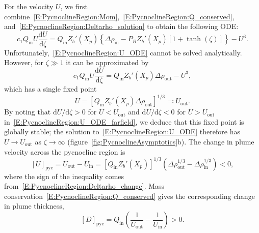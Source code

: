 \documentclass[openacc]{rsproca_new}%
\newcommand{\dd}[2]{\frac{\mathrm{d} #1}{\mathrm{d} #2}}
\newcommand{\Pb}{\textit{P}_B}  %
\newcommand{\cone}{c_1}  %
\renewcommand{\in}{\text{in}} %
\newcommand{\out}{\text{out}}
\begin{document}
For the velocity $U$, we first combine~\eqref{E:PycnoclineRegion:Mom},~\eqref{E:PycnoclineRegion:Q_conserved}, and~\eqref{E:PycnoclineRegion:Deltarho_solution} to obtain the following ODE: 
\begin{equation}\label{E:PycnoclineRegion:U_ODE}
\cone Q_\in U \dd{U}{\zeta} = Q_\in Z_b'(X_p)\left\{\Delta \rho_\in - \Pb Z_b'(X_p) \left[1 + \tanh(\zeta)\right]\right\} - U^3.
\end{equation}
Unfortunately,~\eqref{E:PycnoclineRegion:U_ODE} cannot be solved analytically. However, for $\zeta \gg 1$ it can be approximated by
\begin{equation}\label{E:PycnoclineRegion:U_ODE_farfield}
\cone Q_\in U \dd{U}{\zeta} = Q_\in Z_b'(X_p)\Delta \rho_\out - U^3,
\end{equation}
which has a single fixed point 
\begin{equation}\label{E:PycnoclineRegion:U_Limit}
U = \left[ Q_\in Z_b'(X_p)\Delta \rho_\out\right]^{1/3}  \eqcolon U_\out.
\end{equation}
By noting that $\mathrm{d}U/\mathrm{d}\zeta > 0$  for $U < U_\out$ and $\mathrm{d}U/\mathrm{d}\zeta < 0$  for $U > U_\out$ in~\eqref{E:PycnoclineRegion:U_ODE_farfield}, we deduce that this fixed point is globally stable; the solution to~\eqref{E:PycnoclineRegion:U_ODE} therefore has $U \to U_\out$ as $\zeta \to \infty$ (figure~\ref{fig:PycnoclineAsymptotics}b). The change in plume velocity across the pycnocline region is
\begin{equation}\label{E:PycnoclineRegion:U_change}
\left[U\right]_{\text{pyc}} = U_\out - U_\in = \left[Q_\in Z_b'(X_p)\right]^{1/3} \left(\Delta \rho_\out^{1/3} - \Delta \rho_\in^{1/3}\right) < 0,
\end{equation}
where the sign of the inequality comes from~\eqref{E:PycnoclineRegion:Deltarho_change}. Mass conservation~\eqref{E:PycnoclineRegion:Q_conserved} gives the corresponding change in plume thickness,
\begin{equation}\label{E:PycnoclineRegion:D_change}
\left[D\right]_{\text{pyc}} = Q_\in \left(\frac{1}{U_\out} - \frac{1}{U_\in}\right) > 0.
\end{equation}
\end{document}
